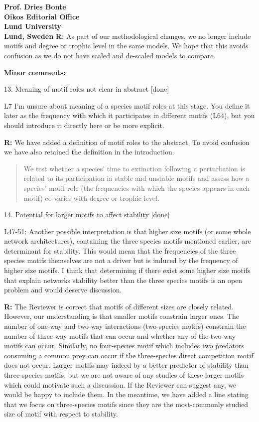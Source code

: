 \documentclass[12pt]{letter}
\begin{document}
\begin{letter}{\bf Prof. Dries Bonte\\
Oikos Editorial Office \\
Lund University \\
Lund, Sweden}
        \textbf{R:} As part of our methodological changes, we no longer include motifs and degree or trophic level in the same models. We hope that this avoids confusion as we do not have scaled and de-scaled models to compare.


  \textbf{Minor comments:}

    13. Meaning of motif roles not clear in abstract [done]

      L7  I’m unsure about meaning of a species motif roles at this stage. You define it later as the frequency with which it participates in different motifs (L64), but you should introduce it directly here or be more explicit.

      \textbf{R:} We have added a definition of motif roles to the abstract. To avoid confusion we have also retained the definition in the introduction.

      \begin{quotation}
       We test whether a species' time to extinction following a perturbation is related to its participation in stable and unstable motifs and assess how a species' motif role (the frequencies with which the species appears in each motif) co-varies with degree or trophic level.
      \end{quotation}


    14. Potential for larger motifs to affect stability [done]

        L47-51: Another possible interpretation is that higher size motifs (or some whole network architectures), containing the three species motifs mentioned earlier, are determinant for stability. This would mean that the frequencies of the three species motifs themselves are not a driver but is induced by the frequency of higher size motifs. I think that determining if there exist some higher size motifs that explain networks stability better than the three species motifs is an open problem and would deserve discussion.
        
        \textbf{R:} The Reviewer is correct that motifs of different sizes are closely related. However, our understanding is that smaller motifs constrain larger ones. The number of one-way and two-way interactions (two-species motifs) constrain the number of three-way motifs that can occur and whether any of the two-way motifs can occur. Similarly, no four-species motif which includes two predators consuming a common prey can occur if the three-species direct competition motif does not occur. Larger motifs may indeed by a better predictor of stability than three-species motifs, but we are not aware of any studies of these larger motifs which could motivate such a discussion. If the Reviewer can suggest any, we would be happy to include them. In the meantime, we have added a line stating that we focus on three-species motifs since they are the most-commonly studied size of motif with respect to stability.
        

\end{letter}
\end{document}
